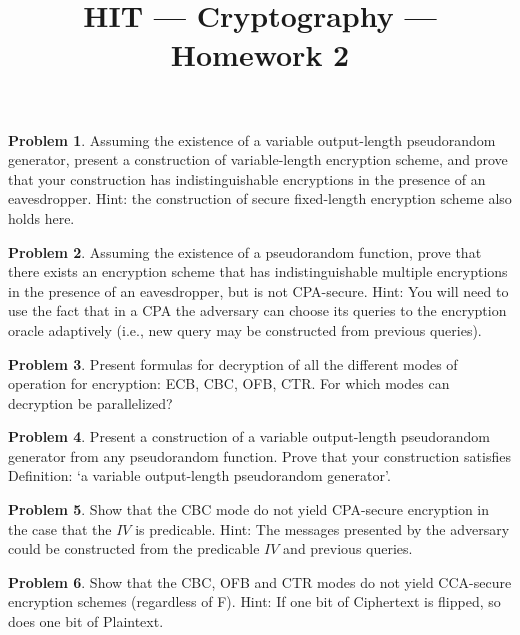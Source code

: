 \documentclass[11pt]{article}
\title{HIT --- Cryptography --- Homework 2}
\theoremstyle{definition}
\newtheorem{problem}{Problem}
\begin{document}
\maketitle

\begin{problem}
Assuming the existence of a variable output-length pseudorandom generator, present a construction of variable-length encryption scheme, and prove that your construction has indistinguishable encryptions in the presence of an eavesdropper. {\small Hint: the construction of secure fixed-length encryption scheme also holds here.}
\end{problem}

\begin{problem}
Assuming the existence of a pseudorandom function, prove that there exists an encryption scheme that has indistinguishable multiple encryptions in the presence of an eavesdropper, but is not CPA-secure.
{\small Hint: You will need to use the fact that in a CPA the adversary can choose its queries to the encryption oracle adaptively (i.e., new query may be constructed from previous queries).}
\end{problem}

\begin{problem}
Present formulas for decryption of all the different modes of operation for encryption: ECB, CBC, OFB, CTR. For which modes can decryption be parallelized?
\end{problem}

\begin{problem}
Present a construction of a variable output-length pseudorandom generator from any pseudorandom function. Prove that your construction satisfies Definition: `a variable output-length pseudorandom generator'.
\end{problem}

\begin{problem}
Show that the CBC mode do not yield CPA-secure encryption in the case that the $IV$ is predicable. {\small Hint: The messages presented by the adversary could be constructed from the predicable $IV$ and previous queries.}
\end{problem}

\begin{problem}
Show that the CBC, OFB and CTR modes do not yield CCA-secure encryption schemes (regardless of F). {\small Hint: If one bit of Ciphertext is flipped, so does one bit of Plaintext.}
\end{problem}
\end{document}
